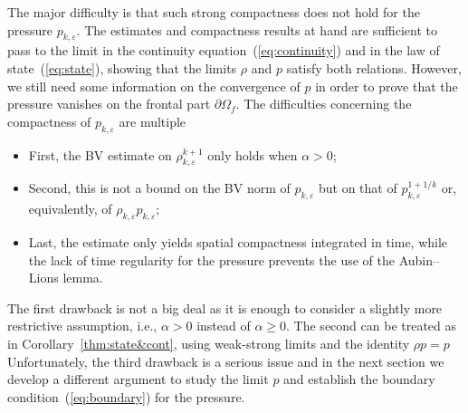 \documentclass[11pt,twoside]{article}
\numberwithin{equation}{section}
\newcommand {\eps}  {\varepsilon}
\begin{document}
 The major difficulty is that such strong compactness does not hold for the pressure $p_{k,\eps}$. The estimates and compactness results  at hand  are sufficient to pass to the limit in the continuity equation~(\ref{eq:continuity}) and in the law of state~(\ref{eq:state}), showing that the limits $\rho$ and $p$ satisfy both relations. However, we still need some information on the convergence of $p$ in order to prove that the pressure vanishes on the frontal part $\partial \Omega_f$. The difficulties concerning the compactness of $p_{k,\eps}$ are multiple
\begin{itemize}
\item First, the BV estimate on $\rho_{k,\eps}^{k+1}$ only holds when $\alpha>0$;
\item Second, this is not a bound on the BV norm of $p_{k,\eps}$ but on that of $p_{k,\eps}^{1+1/k}$ or, equivalently, of $\rho_{k,\eps} p_{k,\eps}$;
\item Last, the estimate only yields spatial compactness integrated in time, while the lack of time regularity for the pressure prevents the use of the Aubin--Lions lemma.
\end{itemize}
The first drawback is not a big deal as it is enough to consider a slightly more restrictive assumption, i.e., $\alpha>0$ instead of $\alpha\ge 0$. The second can be treated as in Corollary~\ref{thm:state&cont}, using weak-strong limits and the identity $\rho p = p$ Unfortunately, the third drawback is a serious issue and in the next section we develop a different argument to study the limit $p$ and establish the boundary condition~(\ref{eq:boundary}) for the pressure.
\end{document}
